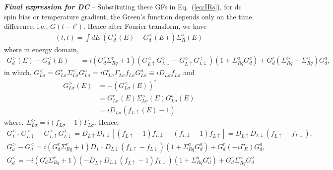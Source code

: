 \documentclass[aps,prb,superscriptaddress]{revtex4-2}
\begin{document}
{\noindent \textbf{\textit{Final expression for DC}}} -- Substituting these GFs in Eq.~(\ref{eq:IRs}), for dc spin bias or temperature gradient, the Green's function depends only on the time difference, i.e., $G(t-t')$. Hence after Fourier transform, we have
\begin{eqnarray}
[(G_{d}^>- G_{d}^<)\Sigma^<_R](t,t)=\int dE ~ (G_{d}^>(E)- G_{d}^<(E))\Sigma^<_R(E) \nonumber
\end{eqnarray}
where in energy domain,
\begin{eqnarray}
G_{d}^>(E)- G_{d}^<(E)&&= i(G^r_{d}\Sigma^r_{Rq} +1) (G^<_{L\uparrow}G^>_{L\downarrow} -G^>_{L\uparrow} G^<_{L\downarrow}) (1+ \Sigma^a_{Rq} G^a_{d}) + G^r_{d} (\Sigma^>_{Rq}-\Sigma^<_{Rq}) G^a_{d},
   \label{inter1}
\end{eqnarray}
in which, $G^<_{L\sigma}=G^r_{L\sigma}\Sigma_{L\sigma}^{<}G^a_{L\sigma} = i G^r_{L\sigma}\Gamma_{L\sigma}f_{L\sigma}  G^a_{L\sigma} \equiv iD_{L\sigma}f_{L\sigma}$ and 
\begin{equation}
\begin{split}
G_{L\sigma}^{>}(E) &= -(G_{L\sigma}^{<}(E))^{\dag} \\
&= G_{L\sigma}^{r}(E)\Sigma_{L\sigma}^{>}(E) G_{L\sigma}^{a}(E)\\
&=iD_{L\sigma}(f_{L\uparrow}(E) - 1)
\end{split}
\end{equation}
where, $\Sigma_{L\sigma}^{>} = i(f_{L\sigma}-1)\Gamma_{L\sigma}$. Hence,
\begin{gather}
G_{L\uparrow}^{<} G_{L\downarrow}^{>} - G_{L\uparrow}^{>} G_{L\downarrow}^{<} = D_{L\uparrow}D_{L\downarrow} [(f_{L\uparrow}-1)f_{L\downarrow} - (f_{L\downarrow}-1) f_{L\uparrow}] = D_{L\uparrow}D_{L\downarrow} (f_{L\uparrow} - f_{L\downarrow}), \\
G_{d}^>- G_{d}^<= i(G^r_{d}\Sigma^r_{Rq} +1) D_{L\uparrow}D_{L\downarrow} (f_{L\uparrow} - f_{L\downarrow}) (1+ \Sigma^a_{Rq} G^a_{d}) + G^r_{d} (-i\Gamma_R) G^a_{d},\label{G><}\\
G_{d}^< =-i(G^r_{d}\Sigma^r_{Rq} +1 ) (-D_{L\uparrow}D_{L\downarrow}(f_{L\uparrow}-1)f_{L\downarrow}) (1+ \Sigma^a_{Rq} G^a_{d}) + G^r_{d} \Sigma^<_{Rq} G^a_{d} \label{Gless}
\end{gather}
\end{document}
